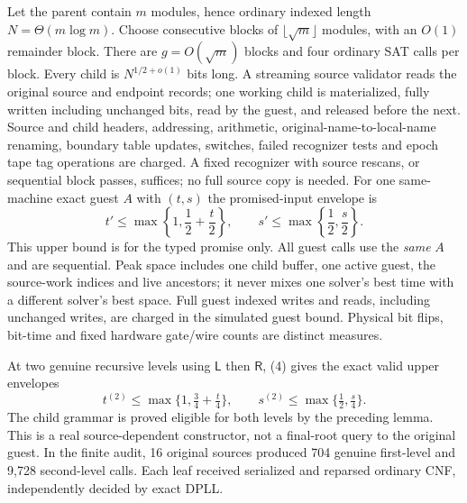 \documentclass[11pt]{article}
\begin{document}
Let the parent contain $m$ modules, hence ordinary indexed
length $N=\Theta(m\log m)$.
Choose consecutive blocks of $\lfloor\sqrt m\rfloor$
modules, with an $O(1)$ remainder block. There are
$g=O(\sqrt m)$ blocks and four ordinary SAT calls per
block. Every child is $N^{1/2+o(1)}$ bits long.
A streaming source validator reads the original source
and endpoint records; one working child is materialized,
fully written including unchanged bits, read by the guest,
and released before the next. Source and child headers,
addressing, arithmetic, original-name-to-local-name
renaming, boundary table updates, switches, failed
recognizer tests and epoch tape tag operations are
charged. A fixed recognizer with source rescans, or
sequential block passes, suffices; no full source copy
is needed. For one same-machine exact guest $A$ with
$(t,s)$ the promised-input envelope is
\[
 t'\le \max\left\{1,\frac12+\frac t2\right\},
 \qquad
 s'\le \max\left\{\frac12,\frac s2\right\}.
 \tag{4}
\]
This upper bound is for the typed promise only. All
guest calls use the \emph{same} $A$ and are sequential.
Peak space includes one child buffer, one active guest,
the source-work indices and live ancestors; it never
mixes one solver's best time with a different solver's
best space. Full guest indexed writes and reads, including
unchanged writes, are charged in the simulated guest
bound. Physical bit flips, bit-time and fixed hardware
gate/wire counts are distinct measures.

At two genuine recursive levels using $\mathsf L$ then
$\mathsf R$, (4) gives the exact valid upper envelopes
\[
 t^{(2)}\le\max\{1,\tfrac34+\tfrac t4\},\qquad
 s^{(2)}\le\max\{\tfrac12,\tfrac s4\}.
 \tag{5}
\]
The child grammar is proved eligible for both levels
by the preceding lemma. This is a real source-dependent
constructor, not a final-root query to the original
guest. In the finite audit, 16 original sources produced
704 genuine first-level and 9,728 second-level calls.
Each leaf received serialized and reparsed ordinary CNF,
independently decided by exact DPLL.
\end{document}
